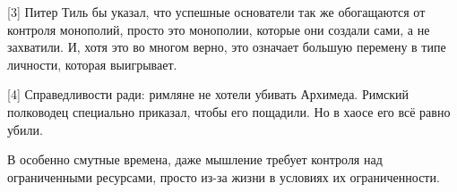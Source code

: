 \documentclass[ebook,12pt,oneside,openany]{memoir}
\begin{document}
[3] Питер Тиль бы указал, что успешные основатели так же обогащаются
от контроля монополий, просто это монополии, которые они создали сами,
а не захватили. И, хотя это во многом верно, это означает большую
перемену в типе личности, которая выигрывает. \newline

[4] Справедливости ради: римляне не хотели убивать Архимеда. Римский
полководец специально приказал, чтобы его пощадили. Но в хаосе его всё
равно убили. \newline

В особенно смутные времена, даже мышление требует контроля над
ограниченными ресурсами, просто из-за жизни в условиях их
ограниченности.
\end{document}
